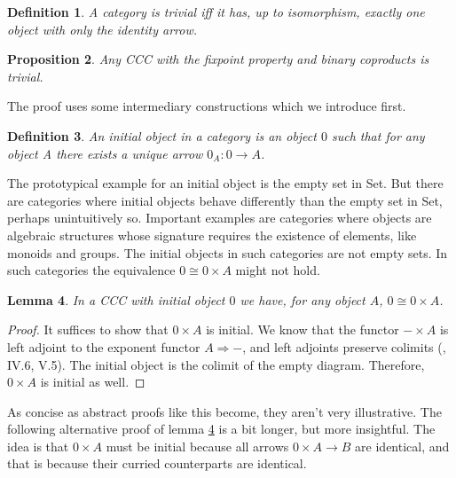\documentclass[a4paper]{article}
\newcommand{\arr}{\rightarrow}
\newcommand{\Arr}{\Rightarrow}
\newcommand{\product}{\!\times\!}
\newtheorem{definition}{Definition}[section]
\newtheorem{proposition}[definition]{Proposition}
\newtheorem{lemma}[definition]{Lemma}
\begin{document}
\begin{definition}
A category is \emph{trivial} iff it has, up to isomorphism, exactly one object
with only the identity arrow.
\end{definition}

\begin{proposition} \label{propCCCNoFixpointCoproducts}
Any CCC with the fixpoint property and binary coproducts is trivial.
\end{proposition}

The proof uses some intermediary constructions which we introduce first.

\begin{definition}
An \emph{initial object} in a category is an object $0$ such that for any object
A there exists a unique arrow $0_A : 0 \arr A$.
\end{definition}

The prototypical example for an initial object is the empty set in Set. But
there are categories where initial objects behave differently than the empty set
in Set, perhaps unintuitively so. Important examples are categories where
objects are algebraic structures whose signature requires the existence of
elements, like monoids and groups. The initial objects in such categories are
not empty sets. In such categories the equivalence $0 \cong 0 \product A$ might
not hold.

\begin{lemma} \label{lem0xAisInitial}
In a CCC with initial object $0$ we have, for any object $A$, $0 \cong 0
\product A$.
\end{lemma}

\begin{proof}
It suffices to show that $0 \product A$ is initial. We know that the functor
$- \product A$ is left adjoint to the exponent functor $A \Arr -$, and
left adjoints preserve colimits (\cite{MacLane71}, IV.6, V.5). The initial object is the colimit of the
empty diagram. Therefore, $0 \product A$ is initial as well.
\end{proof}

As concise as abstract proofs like this become, they aren't very illustrative.
The following alternative proof of lemma \ref{lem0xAisInitial} is a bit longer,
but more insightful. The idea is that $0\product A$ must be initial because all
arrows $0 \product A \arr B$ are identical, and that is because their curried
counterparts are identical.
\end{document}
